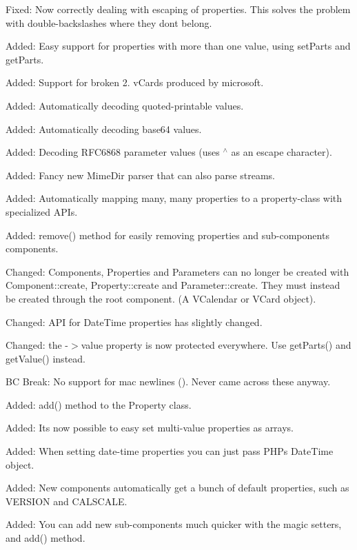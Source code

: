 \begin{DoxyItemize}
\item Fixed\+: Now correctly dealing with escaping of properties. This solves the problem with double-\/backslashes where they don\textquotesingle{}t belong.
\item Added\+: Easy support for properties with more than one value, using set\+Parts and get\+Parts.
\item Added\+: Support for broken 2. v\+Cards produced by microsoft.
\item Added\+: Automatically decoding quoted-\/printable values.
\item Added\+: Automatically decoding base64 values.
\item Added\+: Decoding R\+F\+C6868 parameter values (uses $^\wedge$ as an escape character).
\item Added\+: Fancy new Mime\+Dir parser that can also parse streams.
\item Added\+: Automatically mapping many, many properties to a property-\/class with specialized A\+PI\textquotesingle{}s.
\item Added\+: remove() method for easily removing properties and sub-\/components components.
\item Changed\+: Components, Properties and Parameters can no longer be created with Component\+::create, Property\+::create and Parameter\+::create. They must instead be created through the root component. (A V\+Calendar or V\+Card object).
\item Changed\+: A\+PI for Date\+Time properties has slightly changed.
\item Changed\+: the -\/$>$value property is now protected everywhere. Use get\+Parts() and get\+Value() instead.
\item BC Break\+: No support for mac newlines (). Never came across these anyway.
\item Added\+: add() method to the Property class.
\item Added\+: It\textquotesingle{}s now possible to easy set multi-\/value properties as arrays.
\item Added\+: When setting date-\/time properties you can just pass P\+HP\textquotesingle{}s Date\+Time object.
\item Added\+: New components automatically get a bunch of default properties, such as V\+E\+R\+S\+I\+ON and C\+A\+L\+S\+C\+A\+LE.
\item Added\+: You can add new sub-\/components much quicker with the magic setters, and add() method.
\end{DoxyItemize}


